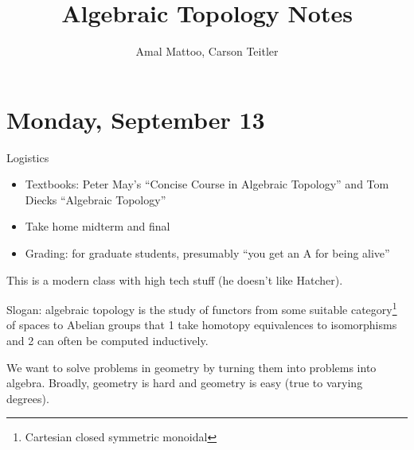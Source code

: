 \documentclass[10pt]{article}
\title{Algebraic Topology Notes}
\author{Amal Mattoo, Carson Teitler}
\theoremstyle{definition}
\begin{document}
	\maketitle 
	\section{Monday, September 13}
	Logistics 
	\begin{itemize}
		\item Textbooks: Peter May's ``Concise Course in Algebraic Topology'' and Tom Diecks ``Algebraic Topology''
		\item Take home midterm and final
		\item Grading: for graduate students, presumably ``you get an A for being alive'' 
	\end{itemize}
	This is a modern class with high tech stuff (he doesn't like Hatcher). 
	
	Slogan: algebraic topology is the study of functors from some suitable category\footnote{Cartesian closed symmetric monoidal} of spaces to Abelian groups that 1 take homotopy equivalences to isomorphisms and 2 can often be computed inductively. 
	
	We want to solve problems in geometry by turning them into problems into algebra. Broadly, geometry is hard and geometry is easy (true to varying degrees).
	
\end{document}
